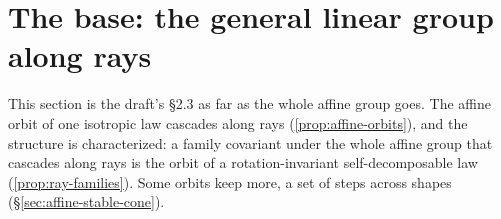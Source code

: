 
\section{The base: the general linear group along rays}
\label{sec:affine-orbits}

This section is the draft's \S 2.3 as far as the whole affine group goes. The affine orbit of one
isotropic law cascades along rays (\ref{prop:affine-orbits}), and the structure is characterized: a
family covariant under the whole affine group that cascades along rays is the orbit of a
rotation-invariant self-decomposable law (\ref{prop:ray-families}). Some orbits keep more, a set of
steps across shapes (\S\ref{sec:affine-stable-cone}).

